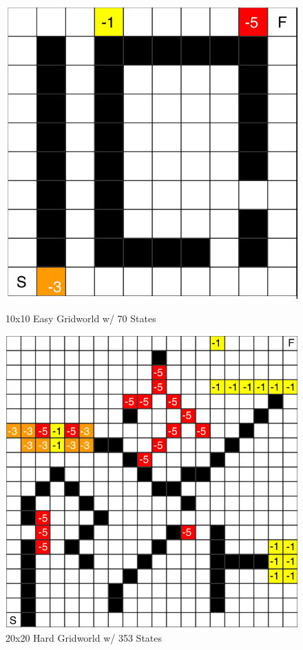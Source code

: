 \documentclass[h]{article}
\begin{document}
  \begin{figure}[H]
      \includegraphics[width=1\textwidth,keepaspectratio]{easy-grid.png} 
      \caption*{10x10 Easy Gridworld w/ 70 States} 
   \endminipage\hfill
      \includegraphics[width=1\textwidth,keepaspectratio]{hard-grid.png} 
      \caption*{20x20 Hard Gridworld w/ 353 States} 
   \endminipage\hfill
\end{figure}
\end{document}
